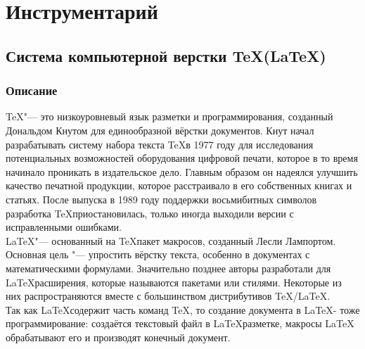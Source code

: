 \documentclass{article}
\begin{document}
\section{Инструментарий}	
	\subsection{Система компьютерной верстки \TeX(\LaTeX)}
		\subsubsection{Описание}
	\TeX "--- это низкоуровневый язык разметки и программирования, созданный Дональдом Кнутом для единообразной вёрстки документов. Кнут начал разрабатывать систему набора текста \TeX в 1977 году для исследования потенциальных возможностей оборудования цифровой печати, которое в то время начинало проникать в издательское дело. Главным образом он надеялся улучшить качество печатной продукции, которое расстраивало в его собственных книгах и статьях. После выпуска в 1989 году поддержки восьмибитных символов разработка \TeX приостановилась, только иногда выходили версии с исправленными ошибками.\\

	\LaTeX  "--- основанный на \TeX пакет макросов, созданный Лесли Лампортом. Основная цель "--- упростить вёрстку текста, особенно в документах с математическими формулами. Значительно позднее авторы разработали для \LaTeX расширения, которые называются пакетами или стилями. Некоторые из них распространяются вместе с большинством дистрибутивов \TeX/\LaTeX.\\

	Так как \LaTeX содержит часть команд \TeX, то создание документа в \LaTeX - тоже программирование: создаётся текстовый файл в \LaTeX разметке, макросы LaTeX обрабатывают его и производят конечный документ.\\
\end{document}
